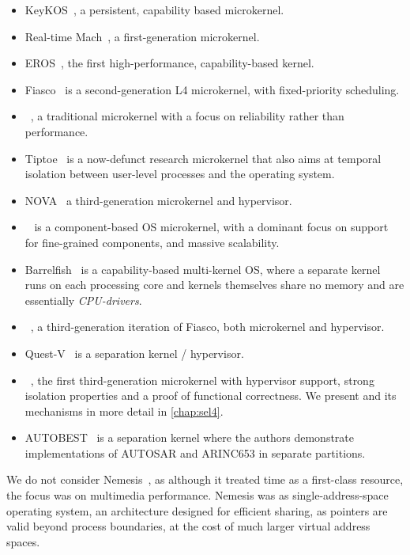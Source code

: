 \begin{itemize}
    \item KeyKOS~\citep{Bomberger_FFHLS_92}, a persistent, capability based microkernel. 
    \item Real-time Mach~\citep{Mercer_RZ_94, Mercer_ST_93}, a first-generation microkernel.
    \item EROS~\citep{Shapiro_SF_99}, the first high-performance, capability-based kernel.
    \item Fiasco~\citep{Haertig_BBHHMRSW_98,Hohmuth_02} is a second-generation L4 microkernel, with fixed-priority scheduling.
    \item \minix~\citep{Herder_BGHT_06}, a traditional microkernel with a focus on reliability
        rather than performance. 
    \item Tiptoe~\citep{Craciunas_KPRS_09} is a now-defunct research microkernel that also aims at
temporal isolation between user-level processes and the operating system.
    \item NOVA~\citep{Steinberg_Kauer_10} a third-generation microkernel and hypervisor.
    \item \composite~\citep{Parmer:phd} is a component-based \gls{OS} microkernel, with a dominant focus
        on support for fine-grained components, and massive scalability.
    \item Barrelfish~\citep{Peter_SBBIHR_10} is a capability-based multi-kernel \gls{OS}, where a separate kernel runs on each processing core and kernels themselves share no memory and are essentially \emph{\gls{CPU}-drivers}.
    \item \fiascooc~\citep{Lackorzynski_WVH_12}, a third-generation iteration of Fiasco, both microkernel and
        hypervisor.
    \item Quest-V~\citep{Danish_LW_11} is a separation kernel / hypervisor.
    \item \selfour~\citep{Klein_AEMSKH_14}, the first third-generation microkernel with
        hypervisor support, strong isolation properties and a proof of functional correctness. We present \selfour 
        and its mechanisms in more detail in \cref{chap:sel4}.
    \item AUTOBEST~\citep{Zuepke_BL_15} is a separation kernel where the authors demonstrate implementations
           of AUTOSAR and ARINC653 in separate partitions.
\end{itemize}

We do not consider Nemesis~\citep{Leslie_MBRBEFH_96}, as although it treated time as a first-class
resource, the focus was on multimedia performance. Nemesis was as single-address-space operating
system, an architecture designed for efficient sharing, as pointers are valid beyond process
boundaries, at the cost of much larger virtual address spaces.

